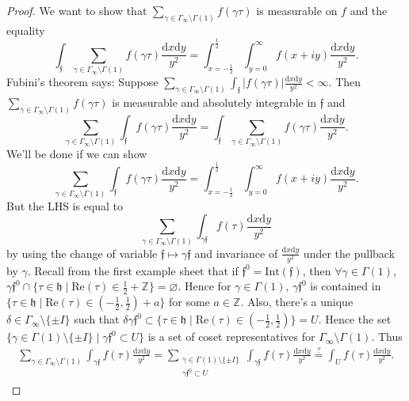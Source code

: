 \documentclass{article}
\theoremstyle{definition}
\begin{document}
\begin{proof}
    We want to show that $\sum_{\gamma \in \Gamma_{\infty}\setminus \Gamma(1)}^{} f(\gamma \tau)$ is measurable on $f$ and the equality \[
    \int_{\mathfrak{f}}^{} \sum_{\gamma \in \Gamma_{\infty}\setminus \Gamma(1)}^{} f(\gamma \tau)\frac{\mathrm{d}x\mathrm{d}y}{y^2} = \int_{x = -\frac{1}{2}}^{\frac{1}{2}} \int_{y=0}^{\infty} f(x+iy)\frac{\mathrm{d}x\mathrm{d}y}{y^2}.
    \]
    Fubini's theorem says: Suppose $\sum_{\gamma \in \Gamma_{\infty}\setminus \Gamma(1)}^{} \int_{\mathfrak{f}}^{} |f(\gamma \tau)| \frac{\mathrm{d}x\mathrm{d}y}{y^2} < \infty$. Then $\sum_{\gamma \in \Gamma_{\infty}\setminus \Gamma(1)}^{} f(\gamma \tau)$ is measurable and absolutely integrable in $\mathfrak{f}$ and \[
    \sum_{\gamma \in \Gamma_{\infty}\setminus \Gamma(1)} \int_{\mathfrak{f}}^{} f(\gamma \tau) \frac{\mathrm{d}x\mathrm{d}y}{y^2} = \int_{\mathfrak{f}} \sum_{ \gamma \in \Gamma_{\infty}\setminus \Gamma(1)}^{} f(\gamma \tau) \frac{\mathrm{d}x\mathrm{d}y}{y^2}. 
    \]
    We'll be done if we can show \[
    \sum_{ \gamma \in \Gamma_{\infty}\setminus \Gamma(1)}^{} \int_{\mathfrak{f}}^{} f(\gamma \tau) \frac{\mathrm{d}x\mathrm{d}y}{y^2} = \int_{x = - \frac{1}{2}}^{\frac{1}{2}}  \int_{y=0}^{\infty} f(x+iy)\frac{\mathrm{d}x\mathrm{d}y}{y^2}.
    \]
    But the LHS is equal to \[
    \sum_{\gamma \in \Gamma_{\infty}\setminus \Gamma(1)}^{} \int_{\gamma \mathfrak{f}}^{} f(\tau)\frac{\mathrm{d}x\mathrm{d}y}{y^2}
    \]
    by using the change of variable $\mathfrak{f} \mapsto \gamma \mathfrak{f}$ and invariance of $\frac{\mathrm{d}x\mathrm{d}y}{y^2}$ under the pullback by $\gamma$. Recall from the first example sheet that if $\mathfrak{f}^0 = \text{Int}(\mathfrak{f})$, then $\forall \gamma \in \Gamma(1)$, $\gamma \mathfrak{f}^0 \cap \{\tau \in \mathfrak{h}\mid \text{Re}(\tau) \in \frac{1}{2} + \mathbb{Z}\} = \varnothing$. Hence for $\gamma \in \Gamma(1)$, $\gamma \mathfrak{f}^0$ is contained in $\{\tau \in \mathfrak{h} \mid \text{Re}(\tau) \in (-\frac{1}{2},\frac{1}{2}) + a\}$ for some $a \in \mathbb{Z}$. Also, there's a unique $\delta \in \Gamma_{\infty}\setminus \{\pm I\}$ such that $\delta \gamma \mathfrak{f}^0 \subset \{\tau \in \mathfrak{h}\mid \text{Re}(\tau)\in(-\frac{1}{2},\frac{1}{2})\} = U$. Hence the set $\{\gamma \in \Gamma(1)\setminus \{\pm I\}\mid \gamma \mathfrak{f}^0 \subset U\}$ is a set of coset representatives for $\Gamma_{\infty}\setminus \Gamma(1)$. Thus 
    \begin{align*}
        \sum_{ \gamma \in \Gamma_{\infty}\setminus \Gamma(1)}^{} \int_{\gamma \mathfrak{f}}^{} f(\tau) \frac{\mathrm{d}x\mathrm{d}y}{y^2} = \sum_{\substack{\gamma \in \Gamma(1)\setminus \{\pm I\} \\ \gamma \mathfrak{f}^0 \subset U}}\int_{\gamma \mathfrak{f}}^{} f(\tau)\frac{\mathrm{d}x\mathrm{d}y}{y^2} \stackrel{?}{=} \int_{U}^{} f(\tau)\frac{\mathrm{d}x\mathrm{d}y}{y^2}. 

\end{align*}
\end{proof}
\end{document}
